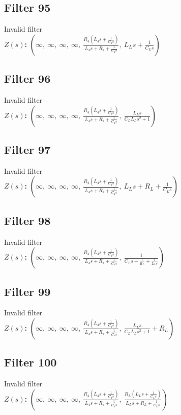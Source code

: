\documentclass{article}
\begin{document}
\subsection*{Filter 95}
Invalid filter \\ 
\textbf{$Z(s)$:} $\left( \infty, \  \infty, \  \infty, \  \infty, \  \frac{R_{4} \left(L_{4} s + \frac{1}{C_{4} s}\right)}{L_{4} s + R_{4} + \frac{1}{C_{4} s}}, \  L_{L} s + \frac{1}{C_{L} s}\right)$ \\ 
\subsection*{Filter 96}
Invalid filter \\ 
\textbf{$Z(s)$:} $\left( \infty, \  \infty, \  \infty, \  \infty, \  \frac{R_{4} \left(L_{4} s + \frac{1}{C_{4} s}\right)}{L_{4} s + R_{4} + \frac{1}{C_{4} s}}, \  \frac{L_{L} s}{C_{L} L_{L} s^{2} + 1}\right)$ \\ 
\subsection*{Filter 97}
Invalid filter \\ 
\textbf{$Z(s)$:} $\left( \infty, \  \infty, \  \infty, \  \infty, \  \frac{R_{4} \left(L_{4} s + \frac{1}{C_{4} s}\right)}{L_{4} s + R_{4} + \frac{1}{C_{4} s}}, \  L_{L} s + R_{L} + \frac{1}{C_{L} s}\right)$ \\ 
\subsection*{Filter 98}
Invalid filter \\ 
\textbf{$Z(s)$:} $\left( \infty, \  \infty, \  \infty, \  \infty, \  \frac{R_{4} \left(L_{4} s + \frac{1}{C_{4} s}\right)}{L_{4} s + R_{4} + \frac{1}{C_{4} s}}, \  \frac{1}{C_{L} s + \frac{1}{R_{L}} + \frac{1}{L_{L} s}}\right)$ \\ 
\subsection*{Filter 99}
Invalid filter \\ 
\textbf{$Z(s)$:} $\left( \infty, \  \infty, \  \infty, \  \infty, \  \frac{R_{4} \left(L_{4} s + \frac{1}{C_{4} s}\right)}{L_{4} s + R_{4} + \frac{1}{C_{4} s}}, \  \frac{L_{L} s}{C_{L} L_{L} s^{2} + 1} + R_{L}\right)$ \\ 
\subsection*{Filter 100}
Invalid filter \\ 
\textbf{$Z(s)$:} $\left( \infty, \  \infty, \  \infty, \  \infty, \  \frac{R_{4} \left(L_{4} s + \frac{1}{C_{4} s}\right)}{L_{4} s + R_{4} + \frac{1}{C_{4} s}}, \  \frac{R_{L} \left(L_{L} s + \frac{1}{C_{L} s}\right)}{L_{L} s + R_{L} + \frac{1}{C_{L} s}}\right)$ \\ 
\end{document}
